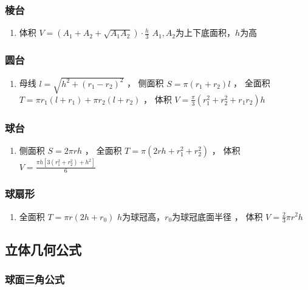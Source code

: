 \documentclass[landscape,a4paper]{article}
\begin{document}
\begin{spacing}{0.3}
\begin{multicols}{2}
\subsubsection{棱台}

\begin{enumerate}
	\item 体积
		$V=(A_1+A_2+\sqrt{A_1A_2}) \cdot \frac{h}{3}$
		$A_1,A_2$为上下底面积，$h$为高
\end{enumerate}

\subsubsection{圆台}

\begin{enumerate}
	\item 母线
		$l=\sqrt{h^2+(r_1-r_2)^2}$
	，  侧面积
		$S=\pi(r_1+r_2)l$
	，  全面积
		$T=\pi r_1(l+r_1)+\pi r_2(l+r_2)$
	，  体积
		$V=\frac{\pi}{3}(r_1^2+r_2^2+r_1r_2)h$
\end{enumerate}

\subsubsection{球台}

\begin{enumerate}
	\item 侧面积
		$S=2\pi rh$
	，    全面积
		$T=\pi(2rh+r_1^2+r_2^2)$
	，    体积
		$V=\frac{\pi h[3(r_1^2+r_2^2)+h^2]}{6}$
\end{enumerate}

\subsubsection{球扇形}

\begin{enumerate}
	\item 全面积
		$T=\pi r(2h+r_0)$
		$h$为球冠高，$r_0$为球冠底面半径
	，   体积
		$V=\frac{2}{3}\pi r^2h$
\end{enumerate}

\subsection{立体几何公式}

\subsubsection{球面三角公式}


\end{multicols}
\end{spacing}
\end{document}
